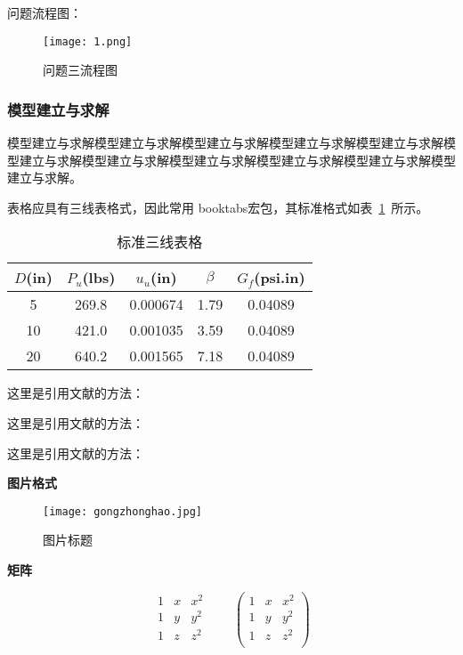 \documentclass{cumcmthesis}
\begin{document}
	问题流程图：
	\begin{figure}[!h]
		\centering
		\texttt{[image: 1.png]}
		\caption{问题三流程图}
	\end{figure}
	
	\subsubsection{模型建立与求解}
	模型建立与求解模型建立与求解模型建立与求解模型建立与求解模型建立与求解模型建立与求解模型建立与求解模型建立与求解模型建立与求解模型建立与求解模型建立与求解。
	
	表格应具有三线表格式，因此常用 booktabs宏包，其标准格式如表~\ref{tab001}~所示。
	\begin{table}[!htbp]
		\caption{标准三线表格}\label{tab001} \centering
		\begin{tabular}{ccccc}
			\toprule[1.5pt]
			$D$(in) & $P_u$(lbs) & $u_u$(in) & $\beta$ & $G_f$(psi.in)\\
			\midrule[1pt]
			5 & 269.8 & 0.000674 & 1.79 & 0.04089\\
			10 & 421.0 & 0.001035 & 3.59 & 0.04089\\
			20 & 640.2 & 0.001565 & 7.18 & 0.04089\\
			\bottomrule[1.5pt]
		\end{tabular}
	\end{table}


	这里是引用文献的方法：\parencite{王瑶2017基于}

	
	这里是引用文献的方法：\parencite{王瑶2017基于}

			
	这里是引用文献的方法：\parencite{王瑶2017基于}

	
	\textbf{图片格式}
	\begin{figure}[h]
		\centering
		\texttt{[image: gongzhonghao.jpg]}
		\caption{图片标题}
	\end{figure}


	\textbf{矩阵}


	$$
	\begin{matrix}
		1 & x & x^2 \\
		1 & y & y^2 \\
		1 & z & z^2 \\
	\end{matrix} \qquad
	\begin{pmatrix}
		1 & x & x^2 \\
		1 & y & y^2 \\
		1 & z & z^2 \\
	\end{pmatrix}
	$$
	
\end{document}
